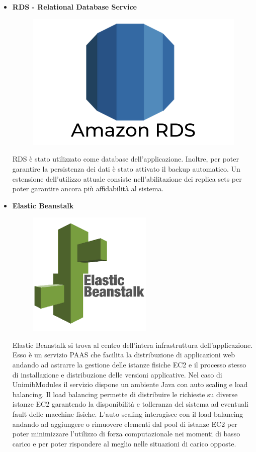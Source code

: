 \documentclass[12pt]{article}
\begin{document}
\begin{itemize}
\item \textbf{RDS - Relational Database Service}
\begin{figure}[H]
\includegraphics[scale=0.1, left]{rds.png}
\end{figure}
RDS è stato utilizzato come database dell'applicazione. Inoltre, per poter garantire la persistenza dei dati è stato attivato il backup automatico. Un estensione dell'utilizzo attuale consiste nell'abilitazione dei replica sets per poter garantire ancora più affidabilità al sistema.
\item \textbf{Elastic Beanstalk}
\begin{figure}[H]
\includegraphics[scale=0.3, left]{elastic.png}
\end{figure}
Elastic Beanstalk si trova al centro dell'intera infrastruttura dell'applicazione. Esso è un servizio PAAS che facilita la distribuzione di applicazioni web andando ad astrarre la gestione delle istanze fisiche EC2 e il processo stesso di installazione e distribuzione delle versioni applicative. Nel caso di UnimibModules il servizio dispone  un ambiente Java con auto scaling e load balancing. Il load balancing permette di distribuire le richieste su diverse istanze EC2 garantendo la disponibilità  e tolleranza del sistema ad eventuali fault delle macchine fisiche. L'auto scaling interagisce con il load balancing andando ad aggiungere o rimuovere elementi dal pool di istanze EC2 per poter minimizzare l'utilizzo di forza computazionale nei momenti di basso carico  e per poter rispondere al meglio nelle situazioni di carico opposte.

\end{itemize}
\end{document}
